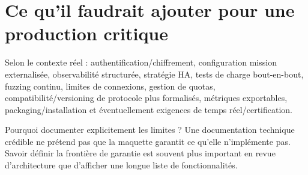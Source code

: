\documentclass[11pt,a4paper]{article}
\begin{document}
\section{Ce qu'il faudrait ajouter pour une production critique}
Selon le contexte réel : authentification/chiffrement, configuration mission externalisée, observabilité structurée, stratégie HA, tests de charge bout-en-bout, fuzzing continu, limites de connexions, gestion de quotas, compatibilité/versioning de protocole plus formalisés, métriques exportables, packaging/installation et éventuellement exigences de temps réel/certification.

\begin{whybox}{Pourquoi documenter explicitement les limites ?}
Une documentation technique crédible ne prétend pas que la maquette garantit ce qu'elle n'implémente pas. Savoir définir la frontière de garantie est souvent plus important en revue d'architecture que d'afficher une longue liste de fonctionnalités.
\end{whybox}
\end{document}
